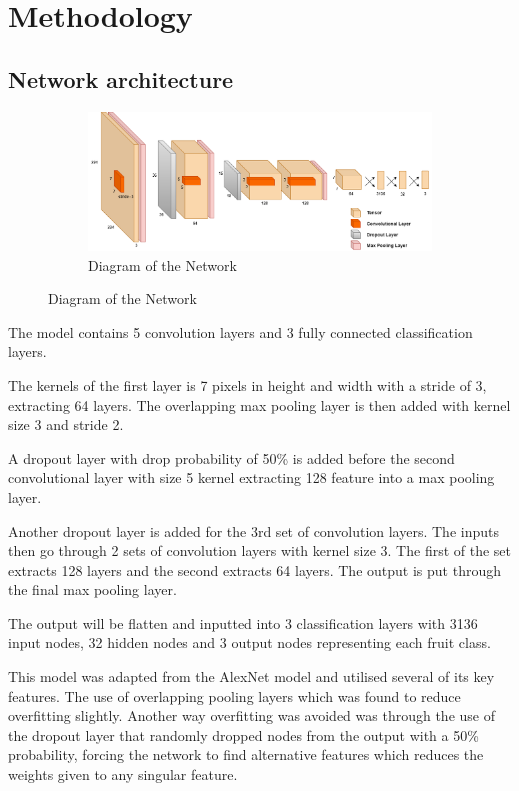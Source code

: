 \documentclass[../main.tex]{subfiles}
\begin{document}
\section{Methodology}

\subsection{Network architecture}

\begin{figure}[h!]
  \centering
  \begin{subfigure}[b]{\linewidth}
    \includegraphics[width=\linewidth]{NetworkDiagram.drawio.png}
    \caption{Diagram of the Network}
  \end{subfigure}
  \label{fig:network-diagram}
\end{figure}

The model contains 5 convolution layers and 3 fully connected classification layers. 

The kernels of the first layer is 7 pixels in height and width with a stride of 3, extracting 64 layers. The overlapping max pooling layer is then added with kernel size 3 and stride 2.

A dropout layer with drop probability of 50\% is added before the second convolutional layer with size 5 kernel extracting 128 feature into a max pooling layer. 

Another dropout layer is added for the 3rd set of convolution layers. The inputs then go through 2 sets of convolution layers with kernel size 3. The first of the set extracts 128 layers and the second extracts 64 layers. The output is put through the final max pooling layer. 

The output will be flatten and inputted into 3 classification layers with 3136 input nodes, 32 hidden nodes and 3 output nodes representing each fruit class. 

This model was adapted from the AlexNet model and utilised several of its key features. The use of overlapping pooling layers which was found to reduce overfitting slightly. Another way overfitting was avoided was through the use of the dropout layer that randomly dropped nodes from the output with a 50\% probability, forcing the network to find alternative features which reduces the weights given to any singular feature. 
\end{document}
